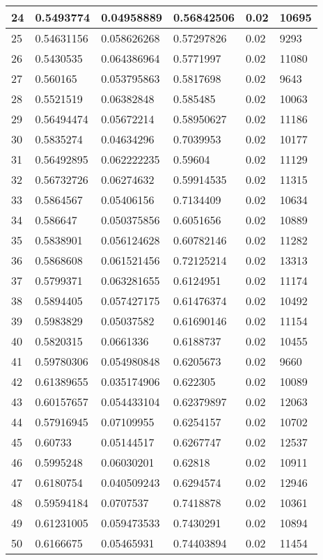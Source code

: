 \begin{longtable}{|l|l|l|l|l|l|}
24 & 0.5493774 & 0.04958889 & 0.56842506 & 0.02 & 10695 \\ \hline 
25 & 0.54631156 & 0.058626268 & 0.57297826 & 0.02 & 9293 \\ \hline 
26 & 0.5430535 & 0.064386964 & 0.5771997 & 0.02 & 11080 \\ \hline 
27 & 0.560165 & 0.053795863 & 0.5817698 & 0.02 & 9643 \\ \hline 
28 & 0.5521519 & 0.06382848 & 0.585485 & 0.02 & 10063 \\ \hline 
29 & 0.56494474 & 0.05672214 & 0.58950627 & 0.02 & 11186 \\ \hline 
30 & 0.5835274 & 0.04634296 & 0.7039953 & 0.02 & 10177 \\ \hline 
31 & 0.56492895 & 0.062222235 & 0.59604 & 0.02 & 11129 \\ \hline 
32 & 0.56732726 & 0.06274632 & 0.59914535 & 0.02 & 11315 \\ \hline 
33 & 0.5864567 & 0.05406156 & 0.7134409 & 0.02 & 10634 \\ \hline 
34 & 0.586647 & 0.050375856 & 0.6051656 & 0.02 & 10889 \\ \hline 
35 & 0.5838901 & 0.056124628 & 0.60782146 & 0.02 & 11282 \\ \hline 
36 & 0.5868608 & 0.061521456 & 0.72125214 & 0.02 & 13313 \\ \hline 
37 & 0.5799371 & 0.063281655 & 0.6124951 & 0.02 & 11174 \\ \hline 
38 & 0.5894405 & 0.057427175 & 0.61476374 & 0.02 & 10492 \\ \hline 
39 & 0.5983829 & 0.05037582 & 0.61690146 & 0.02 & 11154 \\ \hline 
40 & 0.5820315 & 0.0661336 & 0.6188737 & 0.02 & 10455 \\ \hline 
41 & 0.59780306 & 0.054980848 & 0.6205673 & 0.02 & 9660 \\ \hline 
42 & 0.61389655 & 0.035174906 & 0.622305 & 0.02 & 10089 \\ \hline 
43 & 0.60157657 & 0.054433104 & 0.62379897 & 0.02 & 12063 \\ \hline 
44 & 0.57916945 & 0.07109955 & 0.6254157 & 0.02 & 10702 \\ \hline 
45 & 0.60733 & 0.05144517 & 0.6267747 & 0.02 & 12537 \\ \hline 
46 & 0.5995248 & 0.06030201 & 0.62818 & 0.02 & 10911 \\ \hline 
47 & 0.6180754 & 0.040509243 & 0.6294574 & 0.02 & 12946 \\ \hline 
48 & 0.59594184 & 0.0707537 & 0.7418878 & 0.02 & 10361 \\ \hline 
49 & 0.61231005 & 0.059473533 & 0.7430291 & 0.02 & 10894 \\ \hline 
50 & 0.6166675 & 0.05465931 & 0.74403894 & 0.02 & 11454 \\ \hline 
\end{longtable}
